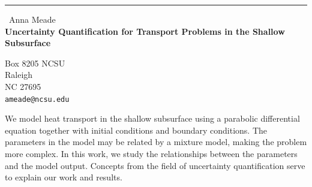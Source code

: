 \documentclass{report}
\begin{document}
\begin{center}
\rule{6in}{1pt} \
{\large Anna Meade \\
{\bf Uncertainty Quantification for Transport Problems in the Shallow Subsurface}}

Box 8205 NCSU \\ Raleigh \\ NC 27695
\\
{\tt ameade@ncsu.edu}\end{center}

We model heat transport in the shallow subsurface using a parabolic
differential equation together with initial conditions and boundary
conditions. The parameters in the model may be related by a mixture
model, making the problem more complex. In this work, we study the
relationships between the parameters and the model output. Concepts from
the field of uncertainty quantification serve to explain our work and
results.
\end{document}

